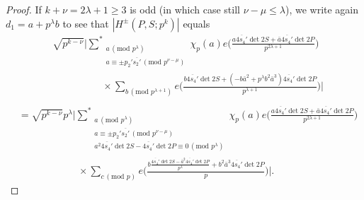 \documentclass[11pt]{amsart}
\numberwithin{equation}{section}
\theoremstyle{plain}
\theoremstyle{definition}
\renewcommand{\geq}{\geqslant}
\renewcommand{\leq}{\le}
\numberwithin{equation}{section}
\begin{document}
\begin{proof}
If $k+\nu =2\lambda+1 \geq 3$ is odd (in which case still $\nu -\mu \leq \lambda$), we write again $d_1 = a + p^{\lambda} b$ to see that 
$|H^{\pm}(P, S;p^k)|$ equals 
\begin{align}
& \sqrt{p^ {k-\nu}}  \Big| \underset{\substack{a \, (\text{mod } p^{\lambda}) \\  a \equiv \pm p_2' \overline{s_2'} \, (\text{mod }p^{\nu - \mu}) }}{\left.\sum\right.^{\ast}}\chi_p(a)  e \Big( \frac{ a  \overline{4s_4'} \det 2S  + \bar{a}  \overline{4s_4'}  \det 2P }{ p^{2\lambda+1}} \Big)\\
 &\quad\quad\quad\quad\quad\times\sum_{b\, (\text{mod } p^{\lambda+1})}e \Big( \frac{ b \overline{4s_4'} \det 2S  +(- b\bar{a}^2+ p^{\lambda}b^2 \bar{a}^3)  \overline{4s_4'}  \det 2P  }{ p^{ \lambda+1}} \Big)\Big|\\
 \end{align}
\begin{align}
 & =  \sqrt{p^ {k-\nu}}  p^{\lambda} \Big| \underset{\substack{a \, (\text{mod } p^{\lambda}) \\  a \equiv \pm p_2' \overline{s_2'} \, (\text{mod }p^{\nu - \mu}) \\     a^2  \overline{4s_4'}\det 2S  -   \overline{4s_4'}  \det 2P \equiv 0\, (\text{mod } p^{\lambda})  }}{\left.\sum\right.^{\ast}}\chi_p(a)  e \Big( \frac{ a  \overline{4s_4'} \det 2S  + \bar{a}  \overline{4s_4'}  \det 2P }{ p^{2\lambda+1}} \Big)\\
& \quad\quad\quad\quad\quad\quad \times \sum_{c\, (\text{mod } p)}e \Big( \frac{ b \frac{ \overline{4s_4'}\det 2S  - \bar{a}^2 \overline{4s_4'}  \det 2P}{p^{\lambda}} +  b^2 \bar{a}^3   \overline{4s_4'}  \det 2P  }{ p } \Big)\Big|.

\end{align}
\end{proof}
\end{document}

